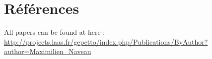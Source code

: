 \documentclass[11pt,a4paper]{moderncv}
\begin{document}
\section{R\'ef\'erences}

All papers can be found at here :
\url{http://projects.laas.fr/gepetto/index.php/Publications/ByAuthor?author=Maximilien_Naveau}\\







\end{document}
